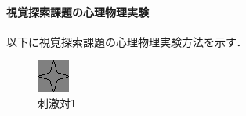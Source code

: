 \paragraph{視覚探索課題の心理物理実験}
以下に視覚探索課題の心理物理実験方法を示す．

\begin{figure}
    \vspace{-1cm}
    \centering
    
    \caption{刺激対1}
    \label{fig:刺激対1}
    \begin{minipage}[t]{.13\textwidth}
        \centering
        \includegraphics[keepaspectratio,width=\textwidth]{../../13_BehavioralExperiment/syuri.png}
    \end{minipage}
    \begin{minipage}[t]{.13\textwidth}
        \centering

\end{minipage}
\end{figure}
